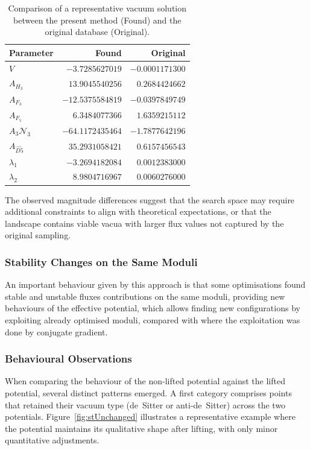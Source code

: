 \documentclass[runningheads]{llncs}
\begin{document}
\begin{table}[htbp]
\centering
\caption{Comparison of a representative vacuum solution
         between the present method (Found) and the original
         database (Original).}
\begin{tabular}{lrr}
\hline
Parameter & Found & Original \\
\hline
$V$ & $-3.7285627019$ & $-0.0001171300$ \\
$A_{H_3}$ & $13.9045540256$ & $0.2684424662$ \\
$A_{F_3}$ & $-12.5375584819$ & $-0.0397849749$ \\
$A_{F_5}$ & $6.3484077366$ & $1.6359215112$ \\
$A_3\mathcal{N}_3$ & $-64.1172435464$ & $-1.7877642196$ \\
$A_{\widehat{D5}}$ & $35.2931058421$ & $0.6157456543$ \\
$\lambda_1$ & $-3.2694182084$ & $0.0012383000$ \\
$\lambda_2$ & $8.9804716967$ & $0.0060276000$ \\
\hline
\end{tabular}
\label{tab:comparison_example}
\end{table}

The observed magnitude differences suggest that the search
space may require additional constraints to align with
theoretical expectations, or that the landscape contains
viable vacua with larger flux values not captured by the
original sampling.

\subsubsection{Stability Changes on the Same Moduli}
An important behaviour given by this approach is that some
optimisations found stable and unstable fluxes contributions
on the same moduli, providing new behaviours of the effective
potential, which allows finding new configurations by
exploiting already optimised moduli, compared with \cite{Damian2022}
where the exploitation was done by conjugate gradient.

\subsubsection{Behavioural Observations}

When comparing the behaviour of the non‑lifted potential against
the lifted potential, several distinct patterns emerged.
A first category comprises points that retained their vacuum
type (de~Sitter or anti‑de~Sitter) across the two potentials.
Figure~\ref{fig:stUnchanged} illustrates a representative
example where the potential maintains its qualitative shape
after lifting, with only minor quantitative adjustments.
\end{document}
